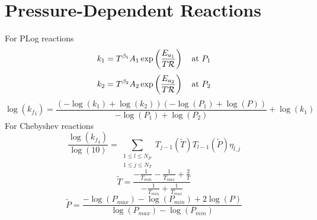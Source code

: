 \documentclass[a4paper,10pt]{article}
\newcommand{\Ru}{\mathcal{R}}
\begin{document}
\section{Pressure-Dependent Reactions}
For PLog reactions
\begin{dmath} k_{1}=T^{\beta_1} A_{1} \operatorname{exp}\left({\frac{E_{a_1}}{T \Ru}}\right)\text{\quad at $P_1$}\end{dmath} 
\begin{dmath} k_{2}=T^{\beta_2} A_{2} \operatorname{exp}\left({\frac{E_{a_2}}{T \Ru}}\right)\text{\quad at $P_2$}\end{dmath} 
\begin{dmath} \log{\left ({k_f}_{i} \right )} = \frac{\left(- \log{\left (k_{1} \right )} + \log{\left (k_{2} \right )}\right) \left(- \log{\left (P_{1} \right )} + \log{\left (P \right )}\right)}{- \log{\left (P_{1} \right )} + \log{\left (P_{2} \right )}} + \log{\left (k_{1} \right )}\end{dmath} 
For Chebyshev reactions
\begin{dmath} \frac{\log{\left ({k_f}_{i} \right )}}{\log{\left (10 \right )}} = \sum_{\substack{1 \leq l \leq N_{P}\\1 \leq j \leq N_{T}}} T_{j - 1}\left(\tilde{T}\right) T_{l - 1}\left(\tilde{P}\right) \eta_{l,j}\end{dmath} 
\begin{dmath} \tilde{T} = \frac{- \frac{1}{T_{min}} - \frac{1}{T_{max}} + \frac{2}{T}}{- \frac{1}{T_{min}} + \frac{1}{T_{max}}}\end{dmath} 
\begin{dmath} \tilde{P} = \frac{- \log{\left (P_{max} \right )} - \log{\left (P_{min} \right )} + 2 \log{\left (P \right )}}{\log{\left (P_{max} \right )} - \log{\left (P_{min} \right )}}\end{dmath} 
\end{document}
